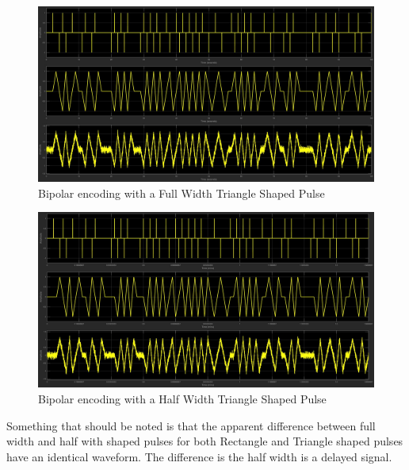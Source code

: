 \documentclass{article}
\begin{document}
\begin{figure}[H]
  \includegraphics[width = \linewidth]{BP_Tri_F.jpg}
  \caption{Bipolar encoding with a Full Width Triangle Shaped Pulse}
  \label{fig:BP-Tri-F}
\end{figure}
\begin{figure}[H]
  \includegraphics[width = \linewidth]{BP_Tri_H.jpg}
  \caption{Bipolar encoding with a Half Width Triangle Shaped Pulse}
  \label{fig:BP-Tri-H}
\end{figure}
Something that should be noted is that the apparent difference between full width and half with shaped pulses for both Rectangle and Triangle shaped pulses have an identical waveform. The difference is the half width is a delayed signal.
\end{document}
